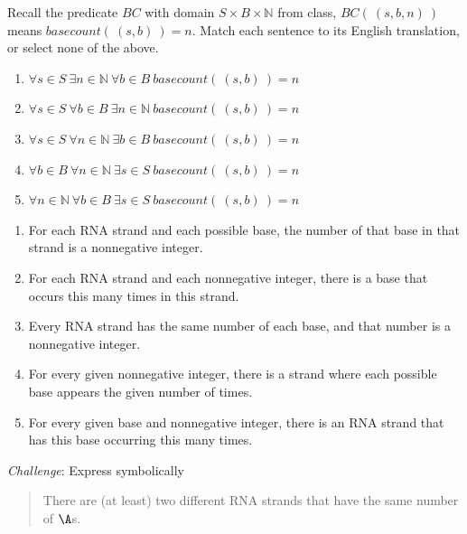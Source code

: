 
Recall the predicate $BC$ with domain $S \times B \times \mathbb{N}$ from class,
$BC(~(s,b,n)~)$ means $basecount(~(s,b)~) = n$.
Match each sentence to its English translation, or select none of the above.
\begin{enumerate}
\item $\forall s \in S ~\exists n \in \mathbb{N} ~\forall b \in B ~basecount(~(s,b)~) = n$
\item $\forall s \in S ~\forall b \in B ~\exists n \in \mathbb{N} ~basecount(~(s,b)~) = n$
\item $\forall s \in S ~\forall n \in \mathbb{N} ~\exists b \in B ~basecount(~(s,b)~) = n$
\item $\forall b \in B ~\forall n \in \mathbb{N} ~\exists s \in S ~basecount(~(s,b)~) = n$
\item $\forall n \in \mathbb{N} ~\forall b \in B ~\exists s \in S ~basecount(~(s,b)~) = n$
\end{enumerate}

\begin{enumerate}[label=\roman*.]
    \item For each RNA strand and each possible base, the number of that base in that strand is a nonnegative integer.
    \item For each RNA strand and each nonnegative integer, there is a base that occurs this many times in this strand.
    \item Every RNA strand has the same number of each base, and that number is a nonnegative integer.
    \item For every given nonnegative integer, there is a strand where each possible base appears the given number of times.
    \item For every given base and nonnegative integer, there is an RNA strand that has this base occurring this many times.
\end{enumerate}


{\it Challenge}: Express symbolically

\begin{quote}
    There are (at least) two different RNA strands that have the same number of $\A$s.
\end{quote}